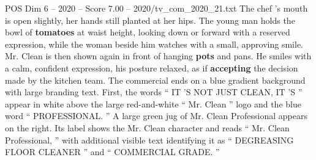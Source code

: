 \begin{textsample}{POS Dim 6 – 2020 – Score 7.00 – 2020/tv\_com\_2020\_21.txt}
The chef ’s mouth is open slightly, her hands still planted at her hips.
The young man holds the bowl of \textbf{tomatoes} at waist height, looking down or forward with a reserved expression, while the woman beside him watches with a small, approving smile.
Mr.
Clean is then shown again in front of hanging \textbf{pots} and pans.
He smiles with a calm, confident expression, his posture relaxed, as if \textbf{accepting} the decision made by the kitchen team.
The commercial ends on a blue gradient background with large branding text.
First, the words “ IT ’S NOT JUST CLEAN, IT ’S ” appear in white above the large red-and-white “ Mr.
Clean ” logo and the blue word “ PROFESSIONAL. ” A large green jug of Mr.
Clean Professional appears on the right.
Its label shows the Mr.
Clean character and reads “ Mr.
Clean Professional, ” with additional visible text identifying it as “ DEGREASING FLOOR CLEANER ” and “ COMMERCIAL GRADE. ”

\end{textsample}
